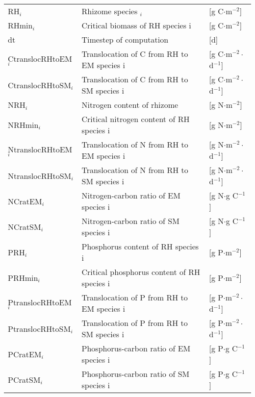 \begin{tabular}{lll}
RH$_i$                  & Rhizome species $_i$                          & [g C$\cdot$m$^{-2}$]                \\
RHmin$_i$               & Critical biomass of RH species i              & [g C$\cdot$m$^{-2}$]                \\
dt                      & Timestep of computation                       & [d]                                 \\
CtranslocRHtoEM$_i$     & Translocation of C from RH to EM species i    & [g C$\cdot$m$^{-2}\cdot$d$^{-1}$]   \\
CtranslocRHtoSM$_i$     & Translocation of C from RH to SM species i    & [g C$\cdot$m$^{-2}\cdot$d$^{-1}$]   \\
NRH$_i$                 & Nitrogen content of rhizome                   & [g N$\cdot$m$^{-2}$]                \\
NRHmin$_i$              & Critical nitrogen content of RH species i     & [g N$\cdot$m$^{-2}$]                \\
NtranslocRHtoEM$_i$     & Translocation of N from RH to EM species i    & [g N$\cdot$m$^{-2}\cdot$d$^{-1}$]   \\
NtranslocRHtoSM$_i$     & Translocation of N from RH to SM species i    & [g N$\cdot$m$^{-2}\cdot$d$^{-1}$]   \\
NCratEM$_i$             & Nitrogen-carbon ratio of EM species i         & [g N$\cdot$g C$^{-1}$]              \\
NCratSM$_i$             & Nitrogen-carbon ratio of SM species i         & [g N$\cdot$g C$^{-1}$]              \\
PRH$_i$                 & Phosphorus content of RH species i            & [g P$\cdot$m$^{-2}$]                \\
PRHmin$_i$              & Critical phosphorus content of RH species i   & [g P$\cdot$m$^{-2}$]                \\
PtranslocRHtoEM$_i$     & Translocation of P from RH to EM species i    & [g P$\cdot$m$^{-2}\cdot$d$^{-1}$]   \\
PtranslocRHtoSM$_i$     & Translocation of P from RH to SM species i    & [g P$\cdot$m$^{-2}\cdot$d$^{-1}$]   \\
PCratEM$_i$             & Phosphorus-carbon ratio of EM species i       & [g P$\cdot$g C$^{-1}$]              \\
PCratSM$_i$             & Phosphorus-carbon ratio of SM species i       & [g P$\cdot$g C$^{-1}$]              \\
\end{tabular}


